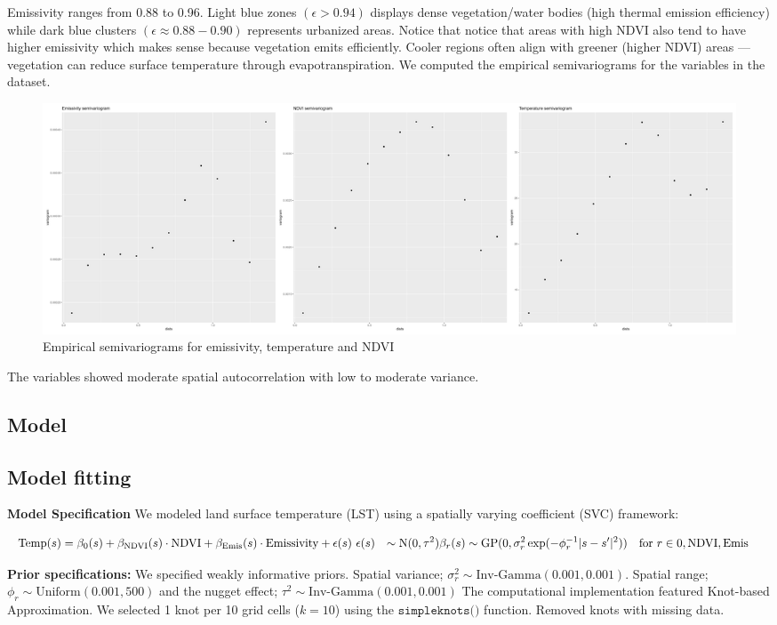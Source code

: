  Emissivity ranges from 0.88 to 0.96. Light blue zones $(\epsilon > 0.94)$ displays dense vegetation/water bodies (high thermal emission efficiency)
 while dark blue clusters $(\epsilon \approx 0.88-0.90)$ represents urbanized areas. Notice that notice that areas with high NDVI also tend to have higher emissivity which makes sense because vegetation emits efficiently.
 Cooler regions often align with greener (higher NDVI) areas — vegetation can reduce surface temperature through evapotranspiration. \newline
 We computed the empirical semivariograms for the variables in the dataset. 
 \begin{figure}[ht]
 \centering
 \includegraphics[width=\textwidth]{../../figures/semivariograms.png}
 \caption{Empirical semivariograms for emissivity, temperature and NDVI}
 \label{fig:semivariograms}
 \end{figure}
The variables showed moderate spatial autocorrelation with low to moderate variance.
\subsection{Model}

\subsection{Model fitting}
\textbf{Model Specification}\newline
We modeled land surface temperature (LST) using a spatially varying coefficient (SVC) framework:

\begin{align}
\text{Temp}(s) &= \beta_0(s) + \beta_{\text{NDVI}}(s)\cdot\text{NDVI} + \beta_{\text{Emis}}(s)\cdot\text{Emissivity} + \epsilon(s) \
\epsilon(s) &\sim \text{N}(0, \tau^2) \newline
\beta_r(s) &\sim \text{GP}(0, \sigma_r^2 \exp(-\phi_r^{-1}|s-s'|^2)) \quad \text{for } r \in {0, \text{NDVI}, \text{Emis}}
\end{align}

\textbf{Prior specifications:} We specified weakly informative priors. Spatial variance; $\sigma_r^2 \sim \text{Inv-Gamma}(0.001, 0.001)$.   Spatial range; $\phi_r \sim \text{Uniform}(0.001, 500)$ and  the nugget effect; $\tau^2 \sim \text{Inv-Gamma}(0.001, 0.001)$ \newline
The computational implementation featured Knot-based Approximation. We selected 1 knot per 10 grid cells ($k=10$) using the  $\texttt{simpleknots()}$ function. Removed knots with missing data.
